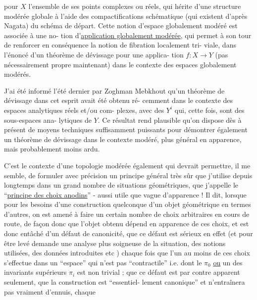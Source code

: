 
pour  $X$  l'ensemble de ses points complexes ou réels, qui hérite
d'une structure modérée globale à l'aide des compactifications
schématique (qui existent d'après Nagata) du schéma de départ.
Cette notion d'espace globalement modéré est associée à une no-%
tion d'\uline{application globalement modérée}, qui permet à son tour de
renforcer en conséquence la notion de fibration localement tri-%
viale, dans l'énoncé d'un théorème de dévissage pour une applica-%
tion  $f : X \longrightarrow Y$  (pas nécessairement propre maintenant) dans
le contexte des espaces globalement modérés.

J'ai été informé l'été dernier par Zoghman Mebkhout
qu'un théorème de dévissage dans cet esprit avait été obtenu ré-%
cemment dans le contexte des espaces analytiques réels et/ou com-%
plexes, avec des  $Y^{i}$  qui, cette fois, sont des sous-espaces ana-%
lytiques de  $Y$. Ce résultat rend plausible qu'on dispose dès à
présent de moyens techniques suffisamment puissants pour démontrer
également un théorème de dévissage dans le contexte modéré, plus
général en apparence, mais probablement moins ardu.

C'est le contexte d'une topologie modérée également
qui devrait permettre, il me semble, de formuler avec précision
un principe général très sûr que j'utilise depuis longtemps dans
un grand nombre de situations géométriques, que j'appelle le
``\uline{principe des choix anodins}'' - aussi utile que vague d'apparence !
Il dit, lorsque pour les besoins d'une construction quelconque
d'un objet géométrique en termes d'autres, on est amené à faire
un certain nombre de choix arbitraires en cours de route, de façon
donc que l'objet obtenu dépend en apparence de ces choix, et est
donc entâché d'un défaut de canonicité, que ce défaut est sérieux
en effet (et pour être levé demande une analyse plus soigneuse de
la situation, des notions utilisées, des données introduites etc )
chaque fois que l'un au moins de ces choix s'effectue dans un
``espace'' qui n'est pas ``contractile'' i.e. dont le  $\pi_{0}$  \uline{ou} un des
invariants supérieurs  $\pi_{i}$  est non trivial ; que ce défaut est
par contre apparent seulement, que la construction est ``essentiel-%
lement canonique'' et n'entraînera pas vraiment d'ennuis, chaque

